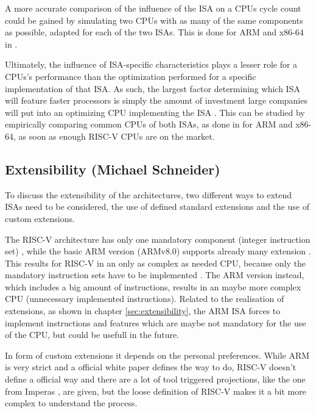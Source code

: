 \documentclass[conference]{IEEEtran}
\begin{document}
	A more accurate comparison of the influence of the \gls{ISA} on a \gls{CPU}s cycle count could be gained
	by simulating two \glspl{CPU} with as many of the same components as possible, adapted for each of the two \glspl{ISA}.
	This is done for ARM and x86-64 in \cite{Akram2017}.

	Ultimately, the influence of \gls{ISA}-specific characteristics plays a lesser role for a \glspl{CPU}'s performance
	than the optimization performed for a specific implementation of that \gls{ISA}.
	As such, the largest factor determining which \gls{ISA} will feature faster processors is simply the amount of investment
	large companies will put into an optimizing \gls{CPU} implementing the \gls{ISA} \cite{Blem2013}.
	This can be studied by empirically comparing common \glspl{CPU} of both \glspl{ISA}, as done in \cite{Blem2013} for ARM and
	x86-64, as soon as enough RISC-V \glspl{CPU} are on the market.
	
	\subsection{Extensibility (Michael Schneider)} \label{dis:Extensibility}
	To discuss the extensibility of the architectures, two different ways to extend \glspl{ISA} need to be considered, the use of defined standard extensions and the use of custom extensions. 
	
	The RISC-V architecture has only one mandatory component (integer instruction set) \cite[page 3f]{Waterman2017}, while the basic ARM version (ARMv8.0) supports already many extension \cite[page 8120] {Arm2020}. This results for RISC-V in an only as complex as needed CPU, because only the mandatory instruction sets have to be implemented \cite[page 3f]{Waterman2017}. The ARM version instead, which includes a big amount of instructions, results in an maybe more complex CPU (unnecessary implemented instructions). Related to the realisation of extensions, as shown in chapter \ref{sec:extensibility}, the ARM \gls{ISA} forces to implement instructions and features which are maybe not mandatory for the use of the CPU, but could be usefull in the future.

	In form of custom extensions it depends on the personal preferences. While ARM is very strict and a official white paper \cite{LauranneChoquin2020} defines the way to do, RISC-V doesn't define a official way and there are a lot of tool triggered projections, like the one from Imperas \cite{Limited2019}, are given, but the loose definition of RISC-V makes it a bit more complex to understand the process.
	
\end{document}
